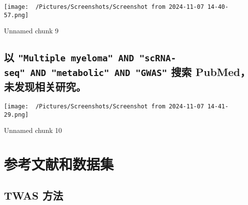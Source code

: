 \documentclass[
]{article}
\begin{document}
\begin{center}\vspace{1.5cm}\end{center}
\def\@captype{figure}
\begin{center}
\texttt{[image: ~/Pictures/Screenshots/Screenshot from 2024-11-07 14-40-57.png]}
\caption{Unnamed chunk 9}\label{fig:unnamed-chunk-9}
\end{center}

\begin{center}\vspace{1.5cm}\end{center}

\hypertarget{ux4ee5-multiple-myeloma-and-scrna-seq-and-metabolic-and-gwas-ux641cux7d22-pubmedux672aux53d1ux73b0ux76f8ux5173ux7814ux7a76}{%
\subsection{\texorpdfstring{以 \texttt{"Multiple\ myeloma"\ AND\ "scRNA-seq"\ AND\ "metabolic"\ AND\ "GWAS"} 搜索 PubMed，未发现相关研究。}{以 "Multiple myeloma" AND "scRNA-seq" AND "metabolic" AND "GWAS" 搜索 PubMed，未发现相关研究。}}\label{ux4ee5-multiple-myeloma-and-scrna-seq-and-metabolic-and-gwas-ux641cux7d22-pubmedux672aux53d1ux73b0ux76f8ux5173ux7814ux7a76}}

\begin{center}\vspace{1.5cm}\end{center}
\def\@captype{figure}
\begin{center}
\texttt{[image: ~/Pictures/Screenshots/Screenshot from 2024-11-07 14-41-29.png]}
\caption{Unnamed chunk 10}\label{fig:unnamed-chunk-10}
\end{center}

\begin{center}\vspace{1.5cm}\end{center}

\hypertarget{workflow}{%
\section{参考文献和数据集}\label{workflow}}

\hypertarget{twas-ux65b9ux6cd5}{%
\subsection{TWAS 方法}\label{twas-ux65b9ux6cd5}}
\end{document}
